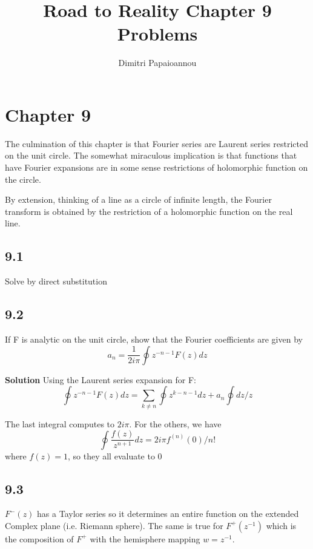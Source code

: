 \documentclass[]{article}
\title{Road to Reality Chapter 9 Problems}
\author{Dimitri Papaioannou}
\begin{document}
\maketitle


\section*{Chapter 9}

The culmination of this chapter is that Fourier series are Laurent series restricted on the unit circle. The somewhat miraculous implication is that functions that have Fourier expansions are in some sense restrictions of holomorphic function on the circle. 

By extension, thinking of a line as a circle of infinite length, 
the Fourier transform is obtained by the restriction of a holomorphic function on the real line. 



\subsection*{9.1}
Solve by direct substitution

\subsection*{9.2}
If F is analytic on the unit circle, show that the Fourier coefficients are given by 
\begin{equation}
a_n = \frac{1}{2i\pi}\oint z^{-n-1}F(z)dz 
\end{equation}


\textbf{Solution}
Using the Laurent series expansion for F:
\begin{equation}
\oint z^{-n-1}F(z)dz = \sum_{k\neq n}\oint z^{k-n-1}dz + a_n \oint dz/z
\end{equation}

The last integral computes to $2i\pi$. 
For the others, we have 
$$
\oint \frac{f(z)}{z^{n+1}}dz = 2i\pi f^{(n)}(0)/n!
$$
where $f(z) = 1$, so they all evaluate to 0


\subsection*{9.3}
$F^-(z)$ has a Taylor series so it determines an entire function on the extended Complex plane (i.e. Riemann sphere).
The same is true for $F^+(z^{-1})$ which is the composition of $F^+$ with the hemisphere mapping $w = z^{-1}$.
\end{document}
